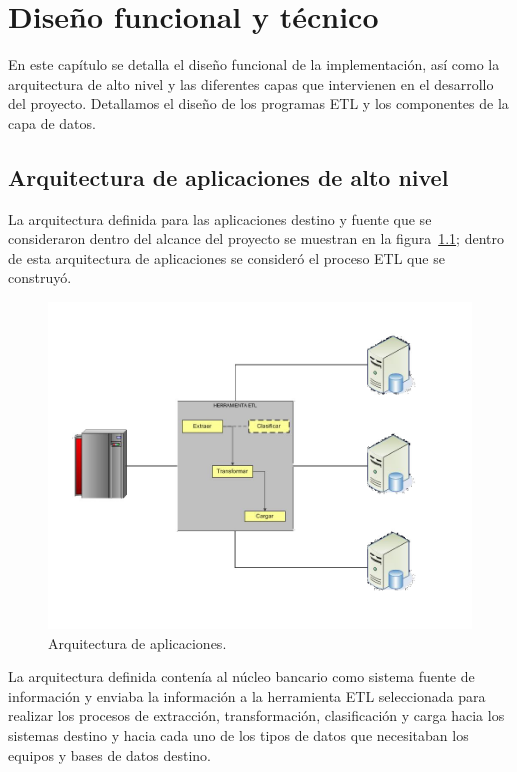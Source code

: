 \chapter{Diseño funcional y técnico}
\label{cap:diseno-funcional}

En este capítulo se detalla el diseño funcional de la implementación, así como
la arquitectura de alto nivel y las diferentes capas que intervienen en el
desarrollo del proyecto.  Detallamos el diseño de los programas ETL y los
componentes de la capa de datos.

\section{Arquitectura de aplicaciones de alto nivel}

La arquitectura definida para las aplicaciones destino y fuente que se
consideraron dentro del alcance del proyecto se muestran en la
figura~\ref{fig:arquitectura}; dentro de esta arquitectura de aplicaciones se
consideró el proceso ETL que se construyó.

\begin{figure}[htb]
  \begin{center}
    \includegraphics[width=0.7\linewidth]{Arquitectura.jpg}
        \caption{Arquitectura de aplicaciones.}
    \label{fig:arquitectura}
  \end{center}
\end{figure}

La arquitectura definida contenía al núcleo bancario como sistema fuente de
información y enviaba la información a la herramienta ETL seleccionada para
realizar los procesos de extracción, transformación, clasificación y carga hacia
los sistemas destino y hacia cada uno de los tipos de datos que necesitaban los
equipos y bases de datos destino.

